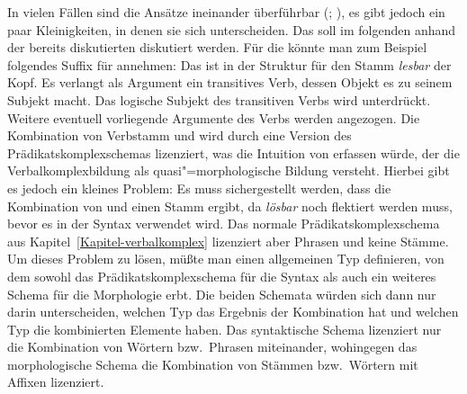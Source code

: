 In vielen Fällen sind die Ansätze ineinander überführbar (\citealp[--169]{Koenig99a}; \citealp[Kapitel~6.2.5.2]{Mueller2002b}),
es gibt jedoch ein paar Kleinigkeiten, in denen sie sich unterscheiden. Das soll im folgenden
anhand der bereits diskutierten \bard diskutiert werden.
Für die \bard könnte man zum Beispiel folgendes Suffix für  annehmen:
\eas
{}%
\zs
Das \bars ist in der Struktur für den Stamm \emph{lesbar} der Kopf. Es verlangt als Argument ein transitives
Verb, dessen Objekt  es zu seinem Subjekt macht. Das logische Subjekt des transitiven Verbs wird unterdrückt.
Weitere eventuell vorliegende Argumente des Verbs  werden angezogen.
Die Kombination von Verbstamm und  wird durch eine Version des Prädikatskomplexschemas lizenziert,
was die Intuition von \citet{Bierwisch90a} erfassen würde, der die Verbalkomplexbildung als quasi"=morphologische
Bildung versteht. Hierbei gibt es jedoch ein kleines Problem: Es muss sichergestellt werden, dass die Kombination
von  und  einen Stamm ergibt, da \emph{lösbar} noch flektiert werden muss, bevor es in
der Syntax verwendet wird. Das normale Prädikatskomplexschema aus Kapitel~\ref{Kapitel-verbalkomplex} lizenziert
aber Phrasen und keine Stämme. Um dieses Problem zu lösen, müßte man einen allgemeinen Typ definieren,
von dem sowohl das Prädikatskomplexschema für die Syntax als auch ein weiteres Schema für die Morphologie erbt.
Die beiden Schemata würden sich dann nur darin unterscheiden, welchen Typ das Ergebnis der Kombination hat und
welchen Typ die kombinierten Elemente haben. Das syntaktische Schema lizenziert nur die Kombination von Wörtern
bzw.\ Phrasen miteinander, wohingegen das morphologische Schema die Kombination von Stämmen bzw.\ Wörtern mit
Affixen lizenziert.

